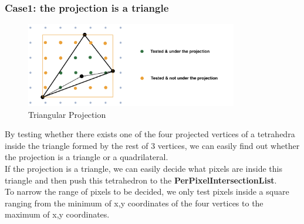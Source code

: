 \documentclass[acmtog]{acmart}
\begin{document}
\subsubsection{Case1: the projection is a triangle}
\begin{figure}[h]
\centering
\includegraphics[height=3.7cm]{figure/triangle}
\caption{Triangular Projection}
\end{figure}
By testing whether there exists one of the four projected vertices of a tetrahedra inside the triangle formed by the rest of 3 vertices, we can easily find out whether the projection is a triangle or a quadrilateral.
\\If the projection is a triangle, we can easily decide what pixels are inside this triangle and then push this tetrahedron to the \textbf{PerPixelIntersectionList}.
\\To narrow the range of pixels to be decided, we only test pixels inside a square ranging from the minimum of x,y coordinates of the four vertices to the maximum of x,y coordinates.
\end{document}
